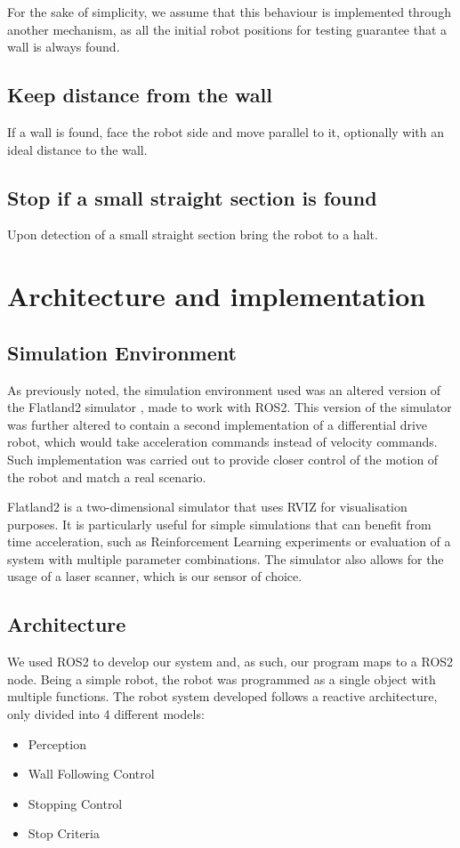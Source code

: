 \documentclass[conference]{IEEEtran}
\begin{document}
For the sake of simplicity, we assume that this behaviour is implemented through another mechanism, as all the initial robot positions for testing guarantee that a wall is always found. 

\subsection{Keep distance from the wall}
If a wall is found, face the robot side and move parallel to it, optionally with an ideal distance to the wall.

\subsection{Stop if a small straight section is found}
Upon detection of a small straight section bring the robot to a halt.

\section{Architecture and implementation} \label{implementation}

\subsection{Simulation Environment}

As previously noted, the simulation environment used was an altered version of the Flatland2 simulator \cite{flatland2}, made to work with ROS2. This version of the simulator was further altered to contain a second implementation of a differential drive robot, which would take acceleration commands instead of velocity commands\cite{flatland3}. Such implementation was carried out to provide closer control of the motion of the robot and match a real scenario.

Flatland2 is a two-dimensional simulator that uses RVIZ for visualisation purposes. It is particularly useful for simple simulations that can benefit from time acceleration, such as Reinforcement Learning experiments or evaluation of a system with multiple parameter combinations. The simulator also allows for the usage of a laser scanner, which is our sensor of choice.

\subsection{Architecture}
We used ROS2 to develop our system and, as such, our program maps to a ROS2 node. Being a simple robot, the robot was programmed as a single object with multiple functions. The robot system developed follows a reactive architecture, only divided into 4 different models:
\begin{itemize}
    \item Perception
    \item Wall Following Control
    \item Stopping Control
    \item Stop Criteria
\end{itemize}
\end{document}
